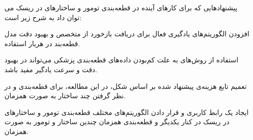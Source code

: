 پیشنهادهایی که برای کارهای آینده در قطعه‌بندی تومور و ساختار‌های در ریسک می توان داد به شرح زیر است:

 افزودن الگوریتم‌های یادگیری فعال  برای دریافت بازخورد از متخصص و بهبود دقت مدل قطعه‌بند در هربار استفاده.

 استفاده از روش‌های  به علت کم‌بودن داده‌های قطعه‌بندی پزشکی می‌تواند در بهبود دقت و سرعت یادگیر مفید باشد.

  تعمیم تابع‌ هزینه‌ی پیشنهاد شده بر اساس شکل، در این مطالعه، برای قطعه‌بندی و در نظر گرفتن چند ساختار به صورت همزمان.
 
 ایجاد یک رابط کاربری و قرار دادن الگوریتم‌های مختلف قطعه‌بندی تومور و ساختارهای در ریسک در کنار یکدیگر و قطعه‌بندی همزمان چندین ساختار و تومور به صورت همزمان.





